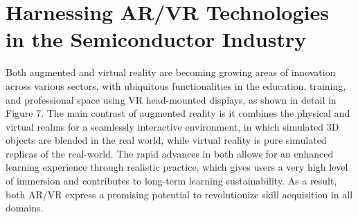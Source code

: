 \section{Harnessing AR/VR Technologies in the Semiconductor Industry}\label{sec6:ar_vr}
    Both augmented and virtual reality are becoming growing areas of innovation across various sectors, with ubiquitous functionalities in the education, training, and professional space using VR head-mounted displays, as shown in detail in Figure 7. The main contrast of augmented reality is it combines the physical and virtual realms for a seamlessly interactive environment, in which simulated 3D objects are blended in the real world, while virtual reality is pure simulated replicas of the real-world. The rapid advances in both allows for an enhanced learning experience through realistic practice, which gives users a very high level of immersion and contributes to long-term learning sustainability. As a result, both AR/VR express a promising potential to revolutionize skill acquisition in all domains.

